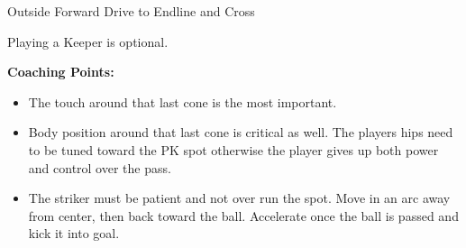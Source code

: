 \begin{evenBlock}{Outside Forward Drive to Endline and Cross}
\begin{minipage}[t]{\linewidth}
\begin{minipage}{.6\linewidth}
        \vspace{6pt}
        
        Playing a Keeper is optional.

        \vspace{10pt}
        
        \textbf{Coaching Points:}
        \begin{itemize}
        \setlength{\itemsep}{0pt}
        \setlength{\parskip}{0pt}
        \setlength{\parsep}{0pt}
        \item The touch around that last cone is the most important. 
        \item Body position around that last cone is critical as well.  The players hips need to be tuned toward the PK spot otherwise the player gives up both power and control over the pass.
        \item The striker must be patient and not over run the spot.  Move in an arc away from center, then back toward the ball.  Accelerate once the ball is passed and kick it into goal.
        \end{itemize}

    \end{minipage}
\end{minipage}

\end{evenBlock}